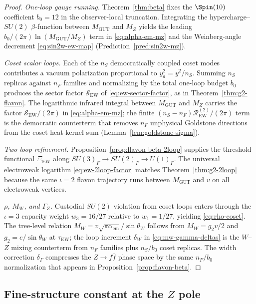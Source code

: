 \begin{proof}
\emph{One-loop gauge running.}
Theorem~\ref{thm:beta} fixes the $\Spin(10)$ coefficient $b_0=12$ in the
observer-local truncation. Integrating the hypercharge--$SU(2)$ $\beta$-function
between $M_{\mathrm{GUT}}$ and $M_Z$ yields the leading
$b_0/(2\pi)\ln(M_{\mathrm{GUT}}/M_Z)$ term in \eqref{eq:alpha-em-mz} and the
Weinberg-angle decrement \eqref{eq:sin2w-ew-map}
(Prediction~\ref{pred:sin2w-mz}).

\emph{Coset scalar loops.}
Each of the $n_S$ democratically coupled coset modes contributes a vacuum
polarization proportional to $y_a^2= y^2/n_S$. Summing $n_S$ replicas against
$n_F$ families and normalizing by the total one-loop budget $b_0$ produces the
sector factor $\mathcal{S}_{\mathrm{EW}}$ of \eqref{eq:ew-sector-factor}, as in
Theorem~\ref{thm:g2-flavon}. The logarithmic infrared integral between
$M_{\mathrm{GUT}}$ and $M_Z$ carries the factor
$\mathcal{S}_{\mathrm{EW}}/(2\pi)$ in \eqref{eq:alpha-em-mz}; the finite
$(n_S-n_F)\mathcal{R}_{\mathrm{EW}}^{(2)}/(2\pi)$ term is the democratic
counterterm that removes $n_F$ unphysical Goldstone directions from the coset
heat-kernel sum (Lemma~\ref{lem:goldstone-sigma}).

\emph{Two-loop refinement.}
Proposition~\ref{prop:flavon-beta-2loop} supplies the threshold functional
$\Xi_{\mathrm{EW}}$ along $SU(3)_F\to SU(2)_F\to U(1)_F$. The universal
electroweak logarithm \eqref{eq:ew-2loop-factor} matches
Theorem~\ref{thm:g2-2loop} because the same $\iota=2$ flavon trajectory
runs between $M_{\mathrm{GUT}}$ and $v$ on all electroweak vertices.

\emph{$\rho$, $M_W$, and $\Gamma_Z$.}
Custodial $SU(2)$ violation from coset loops enters through the $\iota=3$
capacity weight $w_3=16/27$ relative to $w_1=1/27$, yielding
\eqref{eq:rho-coset}. The tree-level relation
$M_W=v\sqrt{\pi\alpha_{\mathrm{em}}}/\sin\theta_W$ follows from
$M_W=g_2 v/2$ and $g_2=e/\sin\theta_W$ at $\tau_{\mathrm{EW}}$; the loop
increment $\delta_W$ in \eqref{eq:mw-gamma-deltas} is the $W$--$Z$ mixing
counterterm from $n_F$ families plus $n_S/b_0$ coset replicas.
The width correction $\delta_\Gamma$ compresses the $Z\to f\bar f$ phase space
by the same $n_F/b_0$ normalization that appears in
Proposition~\ref{prop:flavon-beta}.
\end{proof}

\subsection{Fine-structure constant at the \texorpdfstring{$Z$}{Z} pole}
\label{sec:ew-precision:alpha}

